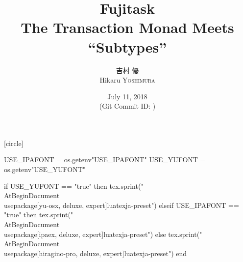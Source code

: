 \hypersetup{colorlinks,linkcolor=,urlcolor=links}

\beamertemplatenavigationsymbolsempty

[circle]

\usepackage{luacode}
\usepackage{luatexja}
\usepackage{pgfpages}
\usepackage{fontspec}

\begin{luacode*}
  USE_IPAFONT = os.getenv"USE_IPAFONT"
  USE_YUFONT = os.getenv"USE_YUFONT"
  
  if USE_YUFONT == "true" then
    tex.sprint("\\AtBeginDocument{\\usepackage[yu-osx, deluxe, expert]{luatexja-preset}}")
  elseif USE_IPAFONT == "true" then
    tex.sprint("\\AtBeginDocument{\\usepackage[ipaex, deluxe, expert]{luatexja-preset}}")
  else
    tex.sprint("\\AtBeginDocument{\\usepackage[hiragino-pro, deluxe, expert]{luatexja-preset}}")
  end
\end{luacode*}

\usepackage{epigraph}
\usepackage{etoolbox}
\usepackage{tikz}
\usepackage{framed}
\usepackage[ss]{libertine}
\usepackage{amsmath}
\usepackage{mathtools}
\usepackage{listings}
\usepackage{caption}
\usepackage{tikz-qtree}

\renewcommand{\kanjifamilydefault}{\gtdefault}



\setmonofont[Ligatures=TeX]{CMU Typewriter Text}



\newcommand{\Fujitask}{{\rmfamily\bfseries Fujitask}}

\title[Fujitask]{%
  \bfseries\rmfamily\mcfamily
  Fujitask \\
  {\footnotesize The Transaction Monad Meets ``Subtypes''}
}
\author[吉村 優]{%
  吉村 優 \\
  Hikaru \textsc{Yoshimura}
}
\date[June 13, 2018]{%
   July 11, 2018 \\%
  {\footnotesize (Git Commit ID: \href{https://github.com/y-yu/fujitask-slide}{\GITAbrHash})}
}

